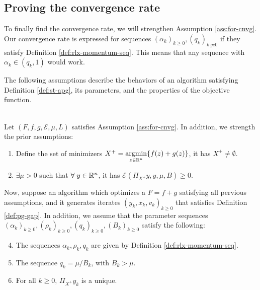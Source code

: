 \documentclass[12pt]{article}
\begin{document}
    \subsection{Proving the convergence rate}
        To finally find the convergence rate, we will strengthen Assumption \ref{ass:for-cnvg}. 
        Our convergence rate is expressed for sequences $(\alpha_k)_{k \ge 0}, (q_k)_{k \ ge 0}$ if they satisfy Definition \ref{def:rlx-momentum-seq}. 
        This means that any sequence with $\alpha_k \in (q_k, 1)$ would work. 
        \par
        The following assumptions describe the behaviors of an algorithm satisfying Definition \ref{def:st-apg}, its parameters, and the properties of the objective function. 
        \begin{assumption}\;\label{ass:lin-cnvg}\\
            Let $(F, f, g, \mathcal E, \mu, L)$ satisfies Assumption \ref{ass:for-cnvg}. 
            In addition, we strength the prior assumptions:
            \begin{enumerate}[nosep]
                \item Define the set of minimizers $X^+ = \mathop{\rm argmin}\limits_{z\in \mathbb R^n}\{ f(z) + g(z)\}$, it has $X^+ \neq \emptyset$. 
                \item $\exists \mu > 0$ such that $\forall\; y \in \mathbb R^n$, it has $\mathcal E \left(\Pi_{X^+}y, y, \mu, B\right) \ge 0$. 
            \end{enumerate}
            Now, suppose an algorithm which optimizes a $F = f + g$ satisfying all pervious assumptions, and it generates iterates $(y_k, x_k, v_k)_{k\ge 0}$ that satisfies Definition \ref{def:pg-gap}. 
            In addition, we assume that the parameter sequences $(\alpha_k)_{k \ge 0}, (\rho_k)_{k \ge 0}, (q_k)_{k \ge 0}, (B_k)_{k \ge 0}$ satisfy the following: 
            \begin{enumerate}[nosep]\setcounter{enumi}{3}
                \item The sequences $\alpha_k, \rho_k, q_k$ are given by Definition \ref{def:rlx-momentum-seq}. 
                \item The sequence $q_k = \mu/B_k$, with $B_k > \mu$. 
                \item For all $k \ge 0$, $\Pi_{X^+}y_k$ is a unique. 
            \end{enumerate}
        \end{assumption}
        \begin{assumption}
            
        \end{assumption}
\end{document}
